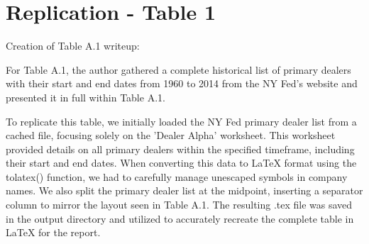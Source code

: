 \documentclass{article}
\begin{document}
\small {\section{Replication - Table 1}}

\begin{table}[!htbp]
\centering
\begin{adjustbox}{width=\textwidth,center}

\end{adjustbox}
\end{table}

\clearpage
Creation of Table A.1 writeup:

For Table A.1, the author gathered a complete historical list of primary dealers with their start and end dates from 1960 to 2014 from the NY Fed's website and presented it in full within Table A.1. 

To replicate this table, we initially loaded the NY Fed primary dealer list from a cached file, focusing solely on the 'Dealer Alpha' worksheet. This worksheet provided details on all primary dealers within the specified timeframe, including their start and end dates. When converting this data to LaTeX format using the tolatex() function, we had to carefully manage unescaped symbols in company names. We also split the primary dealer list at the midpoint, inserting a separator column to mirror the layout seen in Table A.1. The resulting .tex file was saved in the output directory and utilized to accurately recreate the complete table in LaTeX for the report.
\end{document}
